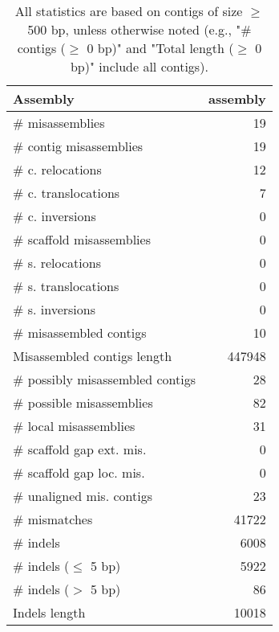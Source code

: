 \documentclass[12pt,a4paper]{article}
\begin{document}
\begin{table}[ht]
\begin{center}
\caption{All statistics are based on contigs of size $\geq$ 500 bp, unless otherwise noted (e.g., "\# contigs ($\geq$ 0 bp)" and "Total length ($\geq$ 0 bp)" include all contigs).}
\begin{tabular}{|l*{1}{|r}|}
\hline
Assembly & assembly \\ \hline
\# misassemblies & 19 \\ \hline
\hspace{2mm}\# contig misassemblies & 19 \\ \hline
\hspace{5mm}\# c. relocations & 12 \\ \hline
\hspace{5mm}\# c. translocations & 7 \\ \hline
\hspace{5mm}\# c. inversions & 0 \\ \hline
\hspace{2mm}\# scaffold misassemblies & 0 \\ \hline
\hspace{5mm}\# s. relocations & 0 \\ \hline
\hspace{5mm}\# s. translocations & 0 \\ \hline
\hspace{5mm}\# s. inversions & 0 \\ \hline
\# misassembled contigs & 10 \\ \hline
Misassembled contigs length & 447948 \\ \hline
\# possibly misassembled contigs & 28 \\ \hline
\hspace{5mm}\# possible misassemblies & 82 \\ \hline
\# local misassemblies & 31 \\ \hline
\# scaffold gap ext. mis. & 0 \\ \hline
\# scaffold gap loc. mis. & 0 \\ \hline
\# unaligned mis. contigs & 23 \\ \hline
\# mismatches & 41722 \\ \hline
\# indels & 6008 \\ \hline
\hspace{5mm}\# indels ($\leq$ 5 bp) & 5922 \\ \hline
\hspace{5mm}\# indels ($>$ 5 bp) & 86 \\ \hline
Indels length & 10018 \\ \hline
\end{tabular}
\end{center}
\end{table}
\end{document}
